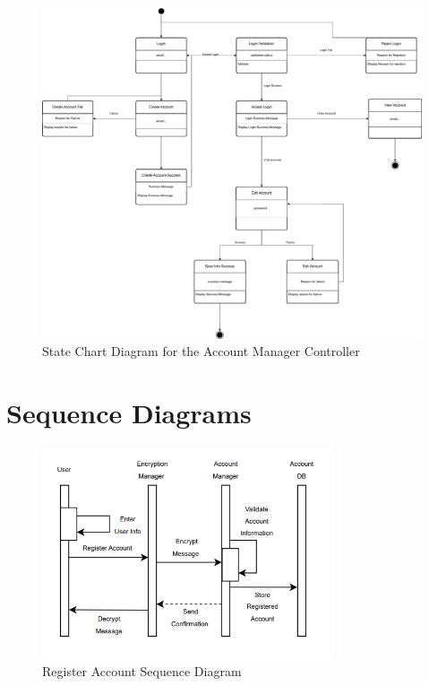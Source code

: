 \documentclass[]{article}
\begin{document}
\begin{figure}[h]
    \centering
    \includegraphics[width=\textwidth]{AccountStateDiagramFinal.pdf}
    \caption{State Chart Diagram for the Account Manager Controller}
\end{figure}


\newpage

\section{Sequence Diagrams}
\label{sec:sequence_diagrams}

\begin{figure}[H]
    \centering
    \includegraphics[width=0.77\textwidth]{RegisterSequenceDiagram.png}
    \caption{Register Account Sequence Diagram}
    \label{fig:register}
\end{figure}
\end{document}
